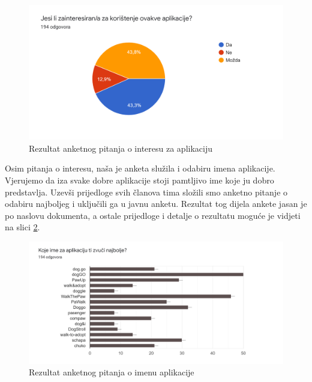         \begin{figure}[H]
		    \includegraphics[scale=0.515]{slike/anketa-interes.PNG} 
		    \centering
		    \caption{Rezultat anketnog pitanja o interesu za aplikaciju}
		    \label{fig:anketa-interes}
	    \end{figure}
        
        \noindent Osim pitanja o interesu, naša je anketa služila i odabiru imena aplikacije. Vjerujemo da iza svake dobre aplikacije stoji pamtljivo ime koje ju dobro predstavlja. Uzevši prijedloge svih članova tima složili smo anketno pitanje o odabiru najboljeg i uključili ga u javnu anketu. Rezultat tog dijela ankete jasan je po naslovu dokumenta, a ostale prijedloge i detalje o rezultatu moguće je vidjeti na slici \ref{fig:anketa-ime}.
        
        
        \begin{figure}[H]
		    \includegraphics[scale=0.55]{slike/anketa-ime.PNG} 
		    \centering
		    \caption{Rezultat anketnog pitanja o imenu aplikacije}
		    \label{fig:anketa-ime}
	    \end{figure}
    